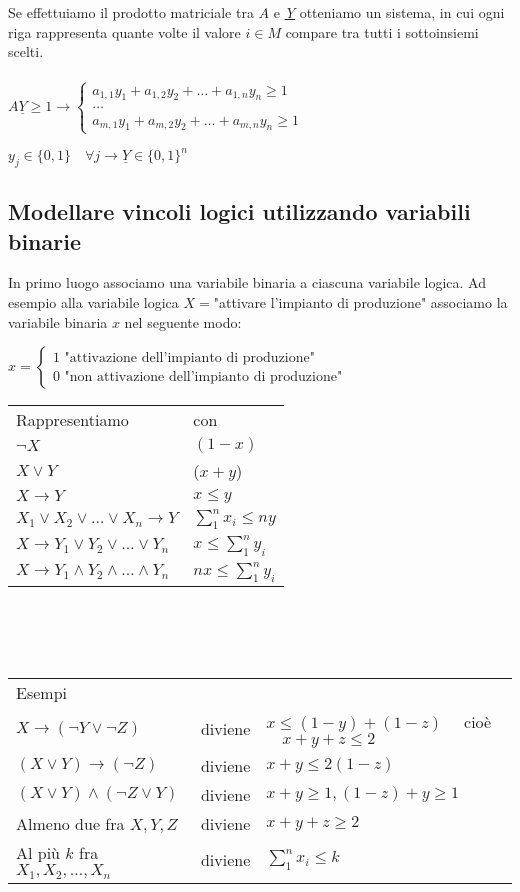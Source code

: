 \documentclass[12pt, twoside, letterpaper]{article}
\newcommand{\casi}[3]{
	$#1 = \begin{cases} \text{#2} \\ \text{#3} \end{cases}$
}
\begin{document}
{				Se effettuiamo il prodotto matriciale tra $A$ e \underline{\textit{Y}} otteniamo un sistema, in cui ogni riga rappresenta quante volte il valore $i \in M$ compare tra tutti i sottoinsiemi scelti.\\\\
				$ A \underline{Y} \geq 1 \rightarrow \begin{cases} a_{1,1} y_1 + a_{1,2}y_2 + \dots + a_{1,n} y_n \geq 1 \\ \dots \\ a_{m,1} y_1 + a_{m,2}y_2 + \dots + a_{m,n} y_n \geq 1 \end{cases}$
				\item $y_j \in \{0,1\} \quad \forall j \rightarrow \underline{Y} \in \{0,1\}^n$ 
			}
			
		\newpage
		\subsection{Modellare vincoli logici utilizzando variabili binarie}
			In primo luogo associamo una variabile binaria a ciascuna variabile logica. Ad esempio alla variabile logica $X=$"attivare l’impianto di produzione" associamo la variabile binaria $x$ nel seguente modo:
			\casi{x}{1 "attivazione dell'impianto di produzione"}{0 "non attivazione dell'impianto di produzione"}
			\begin{tabular}{ll}
				Rappresentiamo & con\\
				$\lnot X$ & $(1-x)$\\	
				$X \lor Y$ & ($x+y$)\\
				$X \rightarrow Y$ & $x \leq y$\\
				$X_1 \lor X_2 \lor \dots \lor X_n \rightarrow Y$ & $\sum_1^n x_i \leq ny$\\
				$X \rightarrow Y_1 \lor Y_2 \lor \dots \lor Y_n$ & $x \leq \sum_1^n y_i$\\
				$X \rightarrow Y_1 \land Y_2 \land \dots \land Y_n$ & $nx \leq \sum_1^n y_i$
			\end{tabular}\\\\\\
			\begin{tabular}{lll}
				Esempi & & \\
				$X \rightarrow (\lnot Y \lor \lnot Z)$ & diviene & $x \leq (1-y)+(1-z) \quad $ cioè $\quad x+y+z \leq 2$\\
				$(X \lor Y) \rightarrow (\lnot Z)$ & diviene & $x+y \leq 2(1-z)$\\
				$(X \lor Y) \land (\lnot Z \lor Y)$ & diviene & $x+y \geq 1, (1-z)+y \geq 1$\\
				Almeno due fra $X,Y,Z$ & diviene & $x+y+z \geq 2$\\
				Al più $k$ fra $X_1, X_2, \dots, X_n$ & diviene & $\sum_1^n x_i \leq k$
			\end{tabular}
			\newpage
			
\end{document}
